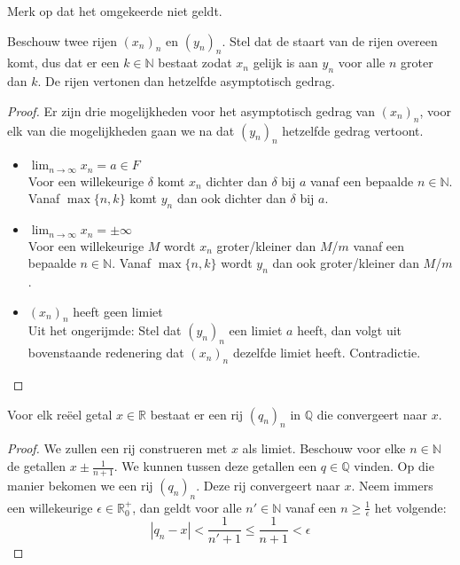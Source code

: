 \documentclass[main.tex]{subfiles}
\begin{document}
\begin{opm}
  Merk op dat het omgekeerde niet geldt.
\end{opm}

\begin{bpr}
  Beschouw twee rijen $(x_{n})_{n}$ en $(y_{n})_{n}$.
  Stel dat de staart van de rijen overeen komt, dus dat er een $k\in \mathbb{N}$ bestaat zodat $x_{n}$ gelijk is aan $y_{n}$ voor alle $n$ groter dan $k$.
  De rijen vertonen dan hetzelfde asymptotisch gedrag.

  \begin{proof}
    Er zijn drie mogelijkheden voor het asymptotisch gedrag van $(x_{n})_{n}$, voor elk van die mogelijkheden gaan we na dat $(y_{n})_{n}$ hetzelfde gedrag vertoont.
    \begin{itemize}
    \item $\lim_{n \rightarrow \infty}x_{n} = a\in F$\\
      Voor een willekeurige $\delta$ komt $x_{n}$ dichter dan $\delta$ bij $a$ vanaf een bepaalde $n\in \mathbb{N}$.
      Vanaf $\max\{n,k\}$ komt $y_{n}$ dan ook dichter dan $\delta$ bij $a$.
    \item $\lim_{n \rightarrow \infty}x_{n} = \pm \infty$\\
      Voor een willekeurige $M$ wordt $x_{n}$ groter/kleiner dan $M$/$m$ vanaf een bepaalde $n\in \mathbb{N}$.
      Vanaf $\max\{n,k\}$ wordt $y_{n}$ dan ook groter/kleiner dan $M$/$m$.
    \item $(x_{n})_{n}$ heeft geen limiet\\
      Uit het ongerijmde:
      Stel dat $(y_{n})_{n}$ een limiet $a$ heeft, dan volgt uit bovenstaande redenering dat $(x_{n})_{n}$ dezelfde limiet heeft.
      Contradictie.
    \end{itemize}
  \end{proof}
\end{bpr}

\begin{bpr}
  Voor elk re\"eel getal $x\in \mathbb{R}$ bestaat er een rij $(q_{n})_{n}$ in $\mathbb{Q}$ die convergeert naar $x$.

  \begin{proof}
    We zullen een rij construeren met $x$ als limiet.
    Beschouw voor elke $n\in \mathbb{N}$ de getallen $x\pm \frac{1}{n+1}$.
    We kunnen tussen deze getallen een $q\in \mathbb{Q}$ vinden.
    Op die manier bekomen we een rij $(q_{n})_{n}$.
    Deze rij convergeert naar $x$.
    Neem immers een willekeurige $\epsilon \in \mathbb{R}_{0}^{+}$, dan geldt voor alle $n'\in\mathbb{N}$ vanaf een $n \ge \frac{1}{\epsilon}$ het volgende:
    \[ |q_{n}-x| < \frac{1}{n'+1} \le \frac{1}{n+1} < \epsilon \]
  \end{proof}
\end{bpr}
\end{document}
